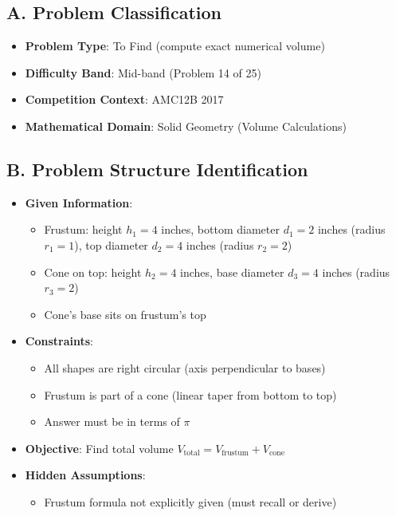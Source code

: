 \documentclass[]{article}
\begin{document}
\begin{problemconfigbox}
\subsection*{A. Problem Classification}
\begin{itemize}[leftmargin=*]
    \item \textbf{Problem Type}: To Find (compute exact numerical volume)
    \item \textbf{Difficulty Band}: Mid-band (Problem 14 of 25)
    \item \textbf{Competition Context}: AMC12B 2017
    \item \textbf{Mathematical Domain}: Solid Geometry (Volume Calculations)
\end{itemize}

\subsection*{B. Problem Structure Identification}
\begin{itemize}[leftmargin=*]
    \item \textbf{Given Information}: 
    \begin{itemize}
        \item Frustum: height $h_1 = 4$ inches, bottom diameter $d_1 = 2$ inches (radius $r_1 = 1$), top diameter $d_2 = 4$ inches (radius $r_2 = 2$)
        \item Cone on top: height $h_2 = 4$ inches, base diameter $d_3 = 4$ inches (radius $r_3 = 2$)
        \item Cone's base sits on frustum's top
    \end{itemize}
    \item \textbf{Constraints}: 
    \begin{itemize}
        \item All shapes are right circular (axis perpendicular to bases)
        \item Frustum is part of a cone (linear taper from bottom to top)
        \item Answer must be in terms of $\pi$
    \end{itemize}
    \item \textbf{Objective}: Find total volume $V_{\text{total}} = V_{\text{frustum}} + V_{\text{cone}}$
    \item \textbf{Hidden Assumptions}: 
    \begin{itemize}
        \item Frustum formula not explicitly given (must recall or derive)

\end{itemize}
\end{itemize}
\end{problemconfigbox}
\end{document}
